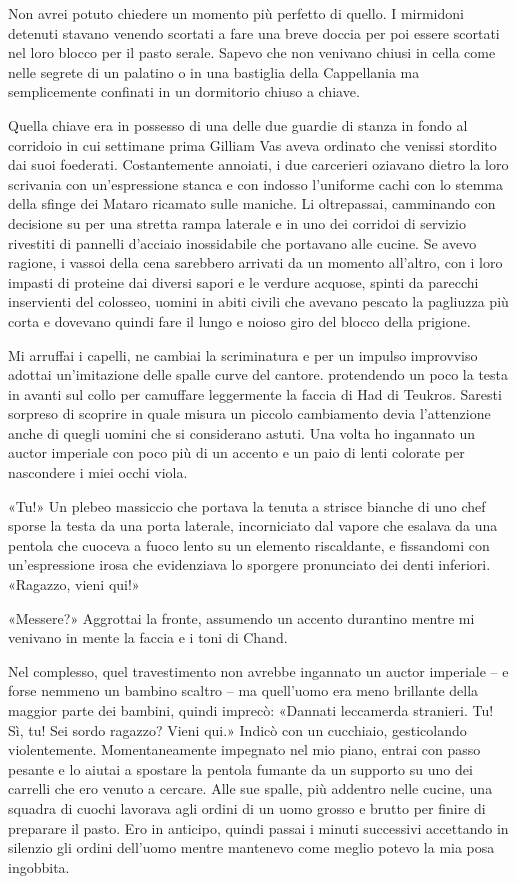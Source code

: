 Non avrei potuto chiedere un momento più perfetto di quello. I mirmidoni
detenuti stavano venendo scortati a fare una breve doccia per poi essere
scortati nel loro blocco per il pasto serale. Sapevo che non venivano
chiusi in cella come nelle segrete di un palatino o in una bastiglia
della Cappellania ma semplicemente confinati in un dormitorio chiuso a
chiave.

Quella chiave era in possesso di una delle due guardie di stanza in
fondo al corridoio in cui settimane prima Gilliam Vas aveva ordinato che
venissi stordito dai suoi foederati. Costantemente annoiati, i due
carcerieri oziavano dietro la loro scrivania con un'espressione stanca e
con indosso l'uniforme cachi con lo stemma della sfinge dei Mataro
ricamato sulle maniche. Li oltrepassai, camminando con decisione su per
una stretta rampa laterale e in uno dei corridoi di servizio rivestiti
di pannelli d'acciaio inossidabile che portavano alle cucine. Se avevo
ragione, i vassoi della cena sarebbero arrivati da un momento all'altro,
con i loro impasti di proteine dai diversi sapori e le verdure acquose,
spinti da parecchi inservienti del colosseo, uomini in abiti civili che
avevano pescato la pagliuzza più corta e dovevano quindi fare il lungo e
noioso giro del blocco della prigione.

Mi arruffai i capelli, ne cambiai la scriminatura e per un impulso
improvviso adottai un'imitazione delle spalle curve del cantore.
protendendo un poco la testa in avanti sul collo per camuffare
leggermente la faccia di Had di Teukros. Saresti sorpreso di scoprire in
quale misura un piccolo cambiamento devia l'attenzione anche di quegli
uomini che si considerano astuti. Una volta ho ingannato un auctor
imperiale con poco più di un accento e un paio di lenti colorate per
nascondere i miei occhi viola.

«Tu!» Un plebeo massiccio che portava la tenuta a strisce bianche di uno
chef sporse la testa da una porta laterale, incorniciato dal vapore che
esalava da una pentola che cuoceva a fuoco lento su un elemento
riscaldante, e fissandomi con un'espressione irosa che evidenziava lo
sporgere pronunciato dei denti inferiori. «Ragazzo, vieni qui!»

«Messere?» Aggrottai la fronte, assumendo un accento durantino mentre mi
venivano in mente la faccia e i toni di Chand.

Nel complesso, quel travestimento non avrebbe ingannato un auctor
imperiale -- e forse nemmeno un bambino scaltro -- ma quell'uomo era
meno brillante della maggior parte dei bambini, quindi imprecò: «Dannati
leccamerda stranieri. Tu! Sì, tu! Sei sordo ragazzo? Vieni qui.» Indicò
con un cucchiaio, gesticolando violentemente. Momentaneamente impegnato
nel mio piano, entrai con passo pesante e lo aiutai a spostare la
pentola fumante da un supporto su uno dei carrelli che ero venuto a
cercare. Alle sue spalle, più addentro nelle cucine, una squadra di
cuochi lavorava agli ordini di un uomo grosso e brutto per finire di
preparare il pasto. Ero in anticipo, quindi passai i minuti successivi
accettando in silenzio gli ordini dell'uomo mentre mantenevo come meglio
potevo la mia posa ingobbita.

